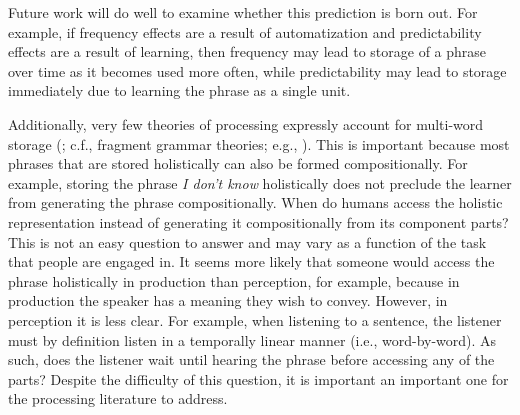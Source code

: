 \documentclass[
  12pt,
  letterpaper,
]{scrreport}
\begin{document}
Future work will do well to examine whether this prediction is born out.
For example, if frequency effects are a result of automatization and
predictability effects are a result of learning, then frequency may lead
to storage of a phrase over time as it becomes used more often, while
predictability may lead to storage immediately due to learning the
phrase as a single unit.

Additionally, very few theories of processing expressly account for
multi-word storage
(; c.f., fragment grammar theories; e.g.,
). This is important because most phrases that are stored
holistically can also be formed compositionally. For example, storing
the phrase \emph{I don't know} holistically does not preclude the
learner from generating the phrase compositionally. When do humans
access the holistic representation instead of generating it
compositionally from its component parts? This is not an easy question
to answer and may vary as a function of the task that people are engaged
in. It seems more likely that someone would access the phrase
holistically in production than perception, for example, because in
production the speaker has a meaning they wish to convey. However, in
perception it is less clear. For example, when listening to a sentence,
the listener must by definition listen in a temporally linear manner
(i.e., word-by-word). As such, does the listener wait until hearing the
phrase before accessing any of the parts? Despite the difficulty of this
question, it is important an important one for the processing literature
to address.
\end{document}
